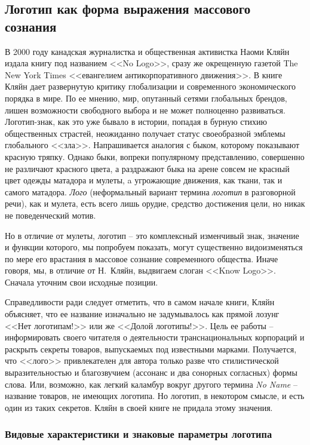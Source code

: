\subsection{Логотип как форма выражения массового сознания}
\label{1.3}

В 2000 году канадская журналистка и общественная активистка Наоми Кляйн
издала книгу под названием <<No Logo>>, сразу же окрещенную газетой
The New York Times <<евангелием антикорпоративного движения>>. В книге Кляйн дает
развернутую критику глобализации и современного экономического порядка в мире.
По ее мнению, мир, опутанный сетями глобальных брендов, лишен возможности свободного
выбора и не может полноценно развиваться.
Логотип-знак, как это уже бывало в истории,  попадая в бурную стихию общественных
страстей, неожиданно получает статус своеобразной эмблемы глобального <<зла>>.
Напрашивается аналогия с быком, которому показывают красную тряпку. Однако быки,
вопреки популярному представлению, совершенно не различают красного цвета,
а раздражают быка на арене совсем не красный цвет одежды матадора и мулеты,
a угрожающие движения, как ткани, так и самого матадора.
\emph{Лого} (неформальный вариант термина \emph{логотип} в разговорной речи),
как и мулета, есть всего лишь орудие, средство достижения цели,
но никак не поведенческий мотив.

Но в отличие от мулеты, логотип -- это комплексный изменчивый знак, значение и
функции которого, мы попробуем показать, могут существенно видоизменяться по мере
его врастания в массовое сознание современного общества. Иначе говоря, мы, в
отличие от Н.~Кляйн, выдвигаем слоган <<Know Logo>>. Сначала уточним свои исходные
позиции.

Справедливости ради следует отметить, что в самом начале книги, Кляйн объясняет,
что  ее название изначально не задумывалось как прямой лозунг <<Нет логотипам!>> или
же <<Долой логотипы!>>. Цель ее работы -- информировать своего читателя о деятельности
транснациональных корпораций и раскрыть секреты товаров, выпускаемых
под известными марками\autocite{klein2003}.
Получается, что <<лого>> привлекателен для автора только разве что стилистической
выразительностью и благозвучием (ассонанс и два сонорных согласных) формы слова.
Или, возможно, как легкий каламбур вокруг другого термина \emph{No Name} --
название товаров, не имеющих логотипа.  Но логотип, в некотором смысле, и есть
один из таких секретов. Кляйн в своей книге не придала этому значения.

\subsubsection{Видовые характеристики и знаковые параметры логотипа}

